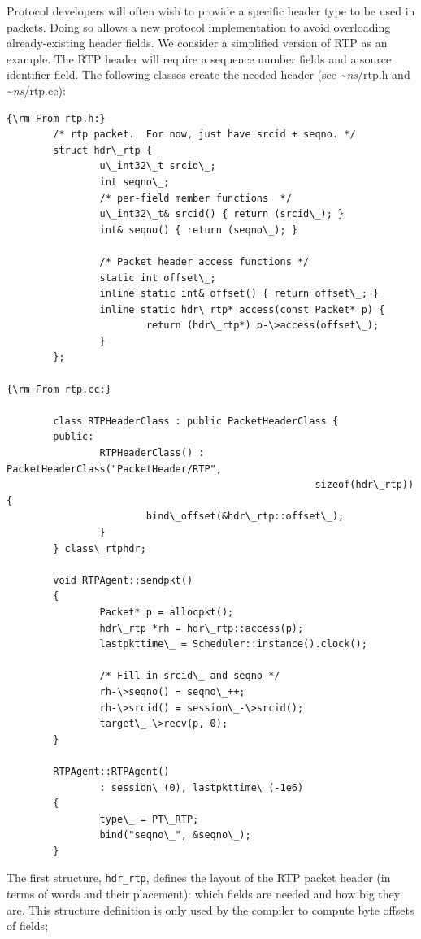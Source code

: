 Protocol developers
will often wish to provide a specific header type to be used in packets.
Doing so allows a new protocol implementation
to avoid overloading already-existing header fields.
We consider a simplified version of RTP as an example.
The RTP header will require a sequence number fields and a source
identifier field.
The following classes create the needed header
(see \textasciitilde\emph{ns}/{rtp.h} and \textasciitilde\emph{ns}/{rtp.cc}):
\begin{verbatim}
{\rm From rtp.h:}
        /* rtp packet.  For now, just have srcid + seqno. */
        struct hdr\_rtp { 
                u\_int32\_t srcid\_;
                int seqno\_;
                /* per-field member functions  */
                u\_int32\_t& srcid() { return (srcid\_); }
                int& seqno() { return (seqno\_); }

                /* Packet header access functions */
                static int offset\_;
                inline static int& offset() { return offset\_; }
                inline static hdr\_rtp* access(const Packet* p) {
                        return (hdr\_rtp*) p-\>access(offset\_);
                }
        };

{\rm From rtp.cc:}

        class RTPHeaderClass : public PacketHeaderClass {
        public: 
                RTPHeaderClass() : PacketHeaderClass("PacketHeader/RTP",
                                                     sizeof(hdr\_rtp)) {
                        bind\_offset(&hdr\_rtp::offset\_);
                }
        } class\_rtphdr;

        void RTPAgent::sendpkt()
        {
                Packet* p = allocpkt();
                hdr\_rtp *rh = hdr\_rtp::access(p);
                lastpkttime\_ = Scheduler::instance().clock();

                /* Fill in srcid\_ and seqno */
                rh-\>seqno() = seqno\_++;
                rh-\>srcid() = session\_-\>srcid();
                target\_-\>recv(p, 0);
        }

        RTPAgent::RTPAgent()
                : session\_(0), lastpkttime\_(-1e6)
        {
                type\_ = PT\_RTP;
                bind("seqno\_", &seqno\_);
        }
\end{verbatim}
The first structure, {\tt hdr\_rtp}, defines the layout
of the RTP packet header (in terms of words and their placement):
which fields are needed and how big they are.
This structure definition is only used by the
compiler to compute byte offsets of fields;
